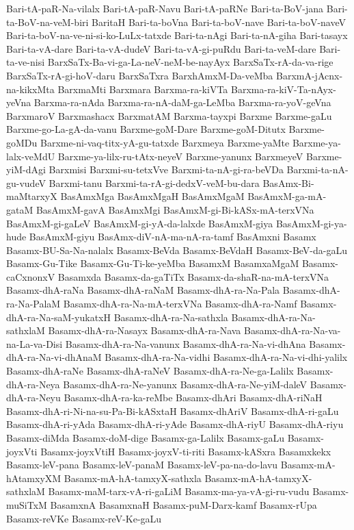{Bari-tA-paR-Na-vilalx
Bari-tA-paR-Navu
Bari-tA-paRNe
Bari-ta-BoV-jana
Bari-ta-BoV-na-veM-biri
BaritaH
Bari-ta-boVna
Bari-ta-boV-nave
Bari-ta-boV-naveV
Bari-ta-boV-na-ve-ni-si-ko-LuLx-tatxde
Bari-ta-nAgi
Bari-ta-nA-giha
Bari-tasayx
Bari-ta-vA-dare
Bari-ta-vA-dudeV
Bari-ta-vA-gi-puRdu
Bari-ta-veM-dare
Bari-ta-ve-nisi
BarxSaTx-Ba-vi-ga-La-neV-neM-be-nayAyx
BarxSaTx-rA-da-va-rige
BarxSaTx-rA-gi-hoV-daru
BarxSaTxra
BarxhAmxM-Da-veMba
BarxmA-jAcnx-na-kikxMta
BarxmaMti
Barxmara
Barxma-ra-kiVTa
Barxma-ra-kiV-Ta-nAyx-yeVna
Barxma-ra-nAda
Barxma-ra-nA-daM-ga-LeMba
Barxma-ra-yoV-geVna
BarxmaroV
Barxmashacx
BarxmatAM
Barxma-tayxpi
Barxme
Barxme-gaLu
Barxme-go-La-gA-da-vanu
Barxme-goM-Dare
Barxme-goM-Ditutx
Barxme-goMDu
Barxme-ni-vaq-titx-yA-gu-tatxde
Barxmeya
Barxme-yaMte
Barxme-ya-lalx-veMdU
Barxme-ya-lilx-ru-tAtx-neyeV
Barxme-yanunx
BarxmeyeV
Barxme-yiM-dAgi
Barxmisi
Barxmi-su-tetxVve
Barxmi-ta-nA-gi-ra-beVDa
Barxmi-ta-nA-gu-vudeV
Barxmi-tanu
Barxmi-ta-rA-gi-dedxV-veM-bu-dara
BasAmx-Bi-maMtarxyX
BasAmxMga
BasAmxMgaH
BasAmxMgaM
BasAmxM-ga-mA-gataM
BasAmxM-gavA
BasAmxMgi
BasAmxM-gi-Bi-kASx-mA-terxVNa
BasAmxM-gi-gaLeV
BasAmxM-gi-yA-da-lalxde
BasAmxM-giya
BasAmxM-gi-ya-hude
BasAmxM-giyu
BasAmx-diV-nA-ma-nA-ra-tamf
BasAmxni
Basamx
Basamx-BU-Sa-Na-nalalx
Basamx-BeVda
Basamx-BeVdaH
Basamx-BeV-da-gaLu
Basamx-Gu-Tike
Basamx-Gu-Ti-ke-yeMba
BasamxM
BasamxaMgaM
Basamx-caCxnonxV
Basamxda
Basamx-da-gaTiTx
Basamx-da-shaR-na-mA-terxVNa
Basamx-dhA-raNa
Basamx-dhA-raNaM
Basamx-dhA-ra-Na-Pala
Basamx-dhA-ra-Na-PalaM
Basamx-dhA-ra-Na-mA-terxVNa
Basamx-dhA-ra-Namf
Basamx-dhA-ra-Na-saM-yukatxH
Basamx-dhA-ra-Na-sathxla
Basamx-dhA-ra-Na-sathxlaM
Basamx-dhA-ra-Nasayx
Basamx-dhA-ra-Nava
Basamx-dhA-ra-Na-va-na-La-va-Disi
Basamx-dhA-ra-Na-vanunx
Basamx-dhA-ra-Na-vi-dhAna
Basamx-dhA-ra-Na-vi-dhAnaM
Basamx-dhA-ra-Na-vidhi
Basamx-dhA-ra-Na-vi-dhi-yalilx
Basamx-dhA-raNe
Basamx-dhA-raNeV
Basamx-dhA-ra-Ne-ga-Lalilx
Basamx-dhA-ra-Neya
Basamx-dhA-ra-Ne-yanunx
Basamx-dhA-ra-Ne-yiM-daleV
Basamx-dhA-ra-Neyu
Basamx-dhA-ra-ka-reMbe
Basamx-dhAri
Basamx-dhA-riNaH
Basamx-dhA-ri-Ni-na-su-Pa-Bi-kASxtaH
Basamx-dhAriV
Basamx-dhA-ri-gaLu
Basamx-dhA-ri-yAda
Basamx-dhA-ri-yAde
Basamx-dhA-riyU
Basamx-dhA-riyu
Basamx-diMda
Basamx-doM-dige
Basamx-ga-Lalilx
Basamx-gaLu
Basamx-joyxVti
Basamx-joyxVtiH
Basamx-joyxV-ti-riti
Basamx-kASxra
Basamxkekx
Basamx-leV-pana
Basamx-leV-panaM
Basamx-leV-pa-na-do-lavu
Basamx-mA-hAtamxyXM
Basamx-mA-hA-tamxyX-sathxla
Basamx-mA-hA-tamxyX-sathxlaM
Basamx-maM-tarx-vA-ri-gaLiM
Basamx-ma-ya-vA-gi-ru-vudu
Basamx-muSiTxM
BasamxnA
BasamxnaH
Basamx-puM-Darx-kamf
Basamx-rUpa
Basamx-reVKe
Basamx-reV-Ke-gaLu
}
